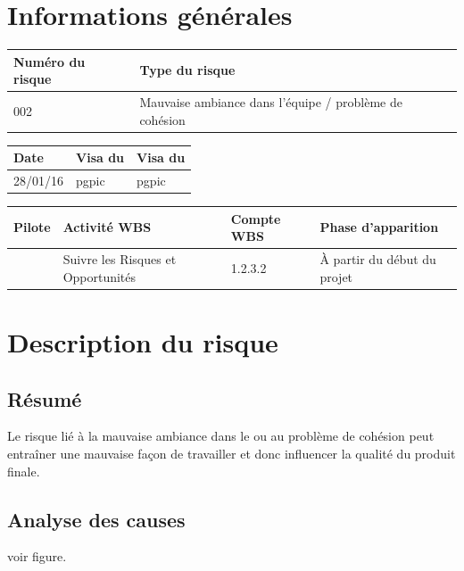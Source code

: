 \section*{Informations générales}

\begin{table}[H]
\centering
	\begin{tabularx}{16.8cm}{|X|X|}
	\hline
	\rowcolor{gray!40} Numéro du risque & Type du risque \\
	\hline
	002 & Mauvaise ambiance dans l'équipe / problème de cohésion \\
	\hline
	\end{tabularx}
\end{table}

\begin{table}[H]
\centering
	\begin{tabularx}{16.8cm}{|X|X|X|}
	\hline
	\rowcolor{gray!40} Date & Visa du \RQ & Visa du \CP \\
	\hline
	 28/01/16 & pgpic & pgpic \\
	\hline
	\end{tabularx}
\end{table}

\begin{table}[H]
\centering
	\begin{tabularx}{16.8cm}{|X|X|X|X|}
	\hline
	\rowcolor{gray!40} Pilote & Activité WBS & Compte WBS & Phase d'apparition \\
	\hline
	 \Michel & Suivre les Risques et Opportunités & 1.2.3.2 & À partir du début du projet\\
	\hline
	\end{tabularx}
\end{table}

\section*{Description du risque}

\subsection*{Résumé}
	Le risque lié à la mauvaise ambiance dans le \PICCourt{} ou au problème de cohésion  peut entraîner une mauvaise façon de travailler et donc influencer la qualité du produit finale.
	
\subsection*{Analyse des causes}
	voir figure.

